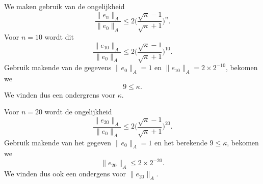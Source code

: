 We maken gebruik van de ongelijkheid
$$ \frac{\lVert e_n \rVert_A}{\lVert e_0 \rVert_A} \leq 2 \bigg(\frac{\sqrt{\kappa}-1}{\sqrt{\kappa}+1}\bigg)^n.$$
Voor $n=10$ wordt dit
$$ \frac{\lVert e_{10} \rVert_A}{\lVert e_0 \rVert_A} \leq 2 \bigg(\frac{\sqrt{\kappa}-1}{\sqrt{\kappa}+1}\bigg)^{10}. $$
Gebruik makende van de gegevens $\lVert e_0 \rVert_A = 1$ en $\lVert e_{10} \rVert_A = 2 \times 2^{-10}$, bekomen we
$$9 \leq \kappa.$$
We vinden dus een ondergrens voor $\kappa$.

Voor $n=20$ wordt de ongelijkheid
$$ \frac{\lVert e_{20} \rVert_A}{\lVert e_0 \rVert_A} \leq 2 \bigg(\frac{\sqrt{\kappa}-1}{\sqrt{\kappa}+1}\bigg)^{20}. $$
Gebruik makende van het gegeven $\lVert e_0 \rVert_A = 1$ en het berekende $9 \leq \kappa$, bekomen we
$$ \lVert e_{20} \rVert_A \leq 2 \times 2^{-20}.$$
We vinden dus ook een ondergens voor $ \lVert e_{20} \rVert_A$.